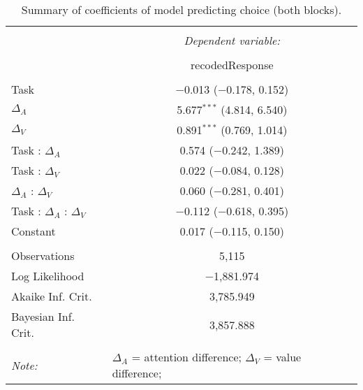 
\begin{table}[!b] \centering 
  \caption{Summary of coefficients of model predicting choice (both blocks).} 
  \label{table:choiceModelAll} 
\begin{tabular}{@{\extracolsep{5pt}}lc} 
\\[-1.8ex]\hline 
\hline \\[-1.8ex] 
 & \multicolumn{1}{c}{\textit{Dependent variable:}} \\ 
\cline{2-2} 
\\[-1.8ex] & recodedResponse \\ 
\hline \\[-1.8ex] 
 Task & $-$0.013 ($-$0.178, 0.152) \\ 
  $\Delta_A$ & 5.677$^{***}$ (4.814, 6.540) \\ 
  $\Delta_V$ & 0.891$^{***}$ (0.769, 1.014) \\ 
  Task : $\Delta_A$ & 0.574 ($-$0.242, 1.389) \\ 
  Task : $\Delta_V$ & 0.022 ($-$0.084, 0.128) \\ 
  $\Delta_A$ : $\Delta_V$ & 0.060 ($-$0.281, 0.401) \\ 
  Task : $\Delta_A$ :  $\Delta_V$ & $-$0.112 ($-$0.618, 0.395) \\ 
  Constant & 0.017 ($-$0.115, 0.150) \\ 
 \hline \\[-1.8ex] 
Observations & 5,115 \\ 
Log Likelihood & $-$1,881.974 \\ 
Akaike Inf. Crit. & 3,785.949 \\ 
Bayesian Inf. Crit. & 3,857.888 \\ 
\hline 
\hline \\[-1.8ex] 
\textit{Note:}  & \multicolumn{1}{l}{\footnotesize $\Delta_A$ = attention difference; $\Delta_V$ = value difference; } \\ 
\end{tabular} 
\end{table} 
